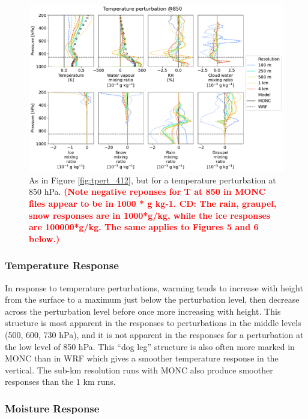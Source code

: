 \documentclass[draft]{agujournal2019}
\newcommand{\todo}[1]{\textcolor{red}{\textbf{(#1)}}}
\begin{document}
\begin{figure}[pth]
    \noindent\includegraphics[width=\textwidth]{figures/pert_diffs_T_0.5_@850}
    \caption{As in Figure \ref{fig:tpert_412}, but for a temperature
    perturbation at 850 hPa. \todo{Note negative reponses for T at 850 in MONC
    files appear to be in 1000 * g kg-1. CD: The rain, graupel, snow responses
    are in  1000*g/kg, while the ice responses are 100000*g/kg. The same applies
    to Figures 5 and 6 below.}}
    \label{fig:tpert_850}
\end{figure}

\subsubsection{Temperature Response}

In response to temperature perturbations, warming tends to increase with height
from the surface to a maximum just below the perturbation level, then decrease
across the perturbation level before once more increasing with height. This
structure is most apparent in the responses to perturbations in the middle
levels (500, 600, 730 hPa), and it is not apparent in the responses for a
perturbation at the low level of 850 hPa. This ``dog leg'' structure is also
often more marked in MONC than in WRF which gives a smoother temperature
response in the vertical. The sub-km resolution runs with MONC also produce
smoother responses than the 1 km runs.

\subsubsection{Moisture Response}
\end{document}
